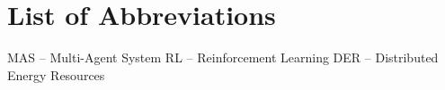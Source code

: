 \chapter*{List of Abbreviations}

MAS – Multi-Agent System
RL – Reinforcement Learning
DER – Distributed Energy Resources

